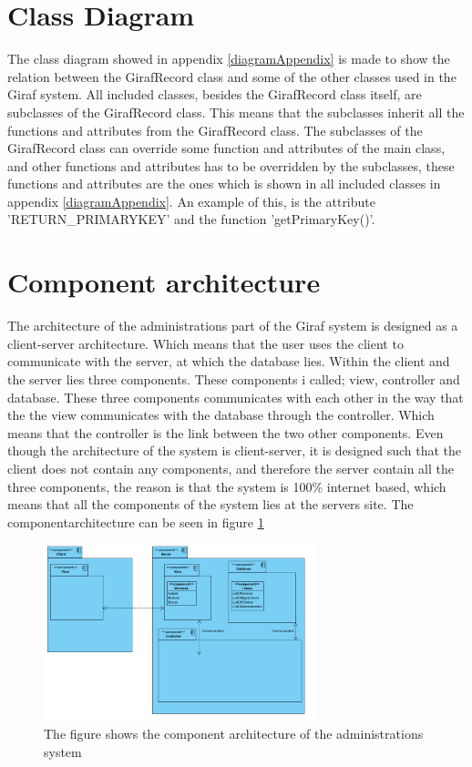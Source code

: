 \section{Class Diagram}

The class diagram showed in appendix \ref{diagramAppendix} is made to show the relation between the GirafRecord class and some of the other classes used in the Giraf system.
All included classes, besides the GirafRecord class itself, are subclasses of the GirafRecord class. This means that the subclasses inherit all the functions and attributes from the GirafRecord class.
The subclasses of the GirafRecord class can override some function and attributes of the main class, and other functions and attributes has to be overridden by the subclasses, these functions and attributes are the ones which is shown in all included classes in appendix \ref{diagramAppendix}.
An example of this, is the attribute 'RETURN\_PRIMARYKEY' and the function 'getPrimaryKey()'.
   
\section{Component architecture}

The architecture of the administrations part of the Giraf system is designed as a client-server architecture. Which means that the user uses the client to communicate with the server, at which the database lies. Within the client and the server lies three components. These components i called; view, controller and database. These three components communicates with each other in the way that the the view communicates with the database through the controller. Which means that the controller is the link between the two other components. Even though the architecture of the system is client-server, it is designed such that the client does not contain any components, and therefore the server contain all the three components, the reason is that the system is 100\% internet based, which means that all the components of the system lies at the servers site. The componentarchitecture can be seen in figure \ref{fig:architecture}

\begin{figure}[!ht]
\centering
\includegraphics[width=300px]{img/ComponentArketektur.png}
\caption{The figure shows the component architecture of the administrations system}
\label{fig:architecture}
\end{figure}

